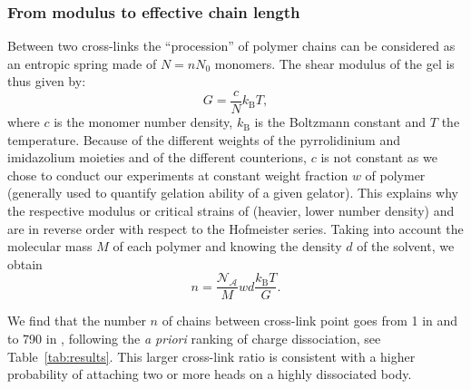 \documentclass[journal=jacsat,manuscript=article]{achemso}
\begin{document}
\subsubsection{From modulus to effective chain length}

Between two cross-links the ``procession'' of polymer chains can be considered as an entropic spring made of $N=n N_0$ monomers. The shear modulus of the gel is thus given by\cite{Rubinstein1996}:
\begin{equation}
G = \frac{c}{N}k_\mathrm{B}T,
\label{eq:G}
\end{equation}
where $c$ is the monomer number density, $k_\mathrm{B}$ is the Boltzmann constant and $T$ the temperature. Because of the different weights of the pyrrolidinium and imidazolium moieties and of the different counterions, $c$ is not constant as we chose to conduct our experiments at constant weight fraction $w$ of polymer (generally used to quantify gelation ability of a given gelator). This explains why the respective modulus or critical strains of  (heavier, lower number density) and  are in reverse order with respect to the Hofmeister series. Taking into account the molecular mass $M$ of each polymer and  knowing the density $d$ of the solvent, we obtain
\begin{equation}
n = \frac{\mathcal{N_A}}{M} w d \frac{k_\mathrm{B}T}{G}.
\label{eq:n}
\end{equation}

We find that the number $n$ of chains between cross-link point goes from 1 in  and  to 790 in , following the \textit{a priori} ranking of charge dissociation, see Table~\ref{tab:results}. This larger cross-link ratio is consistent with a higher probability of attaching two or more heads on a highly dissociated body.
\end{document}
